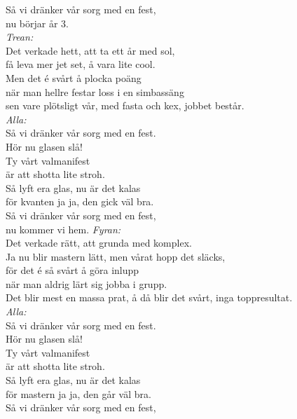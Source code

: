 \documentclass[a6paper, 10pt, twoside]{article}
\begin{document}
\begin{lyrics}
Så vi dränker vår sorg med en fest, \\
nu börjar år 3.
\vspace{5pt} \\
\textit{Trean:} \\
Det verkade hett, att ta ett år med sol, \\
få leva mer jet set, å vara lite cool. \\
Men det é svårt å plocka poäng \\
när man hellre festar loss i en simbassäng \\
sen vare plötsligt vår, \physicalonly{\\}med fasta och kex, jobbet består. 
\vspace{5pt} \\
\textit{Alla:} \\
Så vi dränker vår sorg med en fest. \\
Hör nu glasen slå! \\
Ty vårt valmanifest \\
är att shotta lite stroh. \\
Så lyft era glas, nu är det kalas \\
för kvanten ja ja, den gick väl bra. \\
Så vi dränker vår sorg med en fest, \\
nu kommer vi hem.
\newpage
\noindent
\textit{Fyran:} \\
Det verkade rätt, att grunda med komplex. \\
Ja nu blir mastern lätt, men vårat hopp det släcks, \\
för det é så svårt å göra inlupp \\
när man aldrig lärt sig jobba i grupp. \\
Det blir mest en massa prat, \physicalonly{\\}å då blir det svårt, inga toppresultat. 
\vspace{5pt} \\
\textit{Alla:} \\
Så vi dränker vår sorg med en fest. \\
Hör nu glasen slå! \\
Ty vårt valmanifest \\
är att shotta lite stroh. \\
Så lyft era glas, nu är det kalas \\
för mastern ja ja, den går väl bra. \\
Så vi dränker vår sorg med en fest, \\

\end{lyrics}
\end{document}
